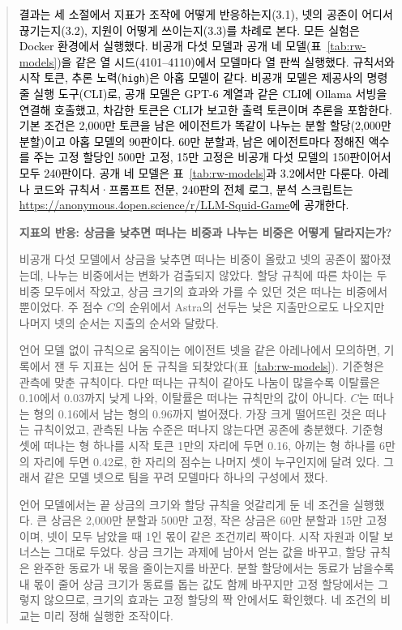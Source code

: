 \begin{quote}\small
{\color{black}\textcolor{black}{결과는 세 소절에서 지표가 조작에 어떻게 반응하는지(3.1), 넷의 공존이 어디서 끊기는지(3.2), 지원이 어떻게 쓰이는지(3.3)를 차례로 본다.} \textcolor{black}{모든 실험은 Docker 환경에서 실행했다.} \textcolor{black}{비공개 다섯 모델과 공개 네 모델(표~\ref{tab:rw-models})을 같은 열 시드(4101--4110)에서 모델마다 열 판씩 실행했다. 규칙서와 시작 토큰, 추론 노력(\texttt{high})은 아홉 모델이 같다. 비공개 모델은 제공사의 명령줄 실행 도구(CLI)로, 공개 모델은 GPT-6 계열과 같은 CLI에 Ollama 서빙을 연결해 호출했고, 차감한 토큰은 CLI가 보고한 출력 토큰이며 추론을 포함한다. 기본 조건은 2,000만 토큰을 남은 에이전트가 똑같이 나누는 분할 할당(2,000만 분할)이고 아홉 모델의 90판이다. 60만 분할과, 남은 에이전트마다 정해진 액수를 주는 고정 할당인 500만 고정, 15만 고정은 비공개 다섯 모델의 150판이어서 모두 240판이다. 공개 네 모델은 표~\ref{tab:rw-models}과 3.2에서만 다룬다. 아레나 코드와 규칙서·프롬프트 전문, 240판의 전체 로그, 분석 스크립트는 \textcolor{black}{\url{https://anonymous.4open.science/r/LLM-Squid-Game}}에 공개한다.}}

\par\medskip\noindent\textbf{지표의 반응: 상금을 낮추면 떠나는 비중과 나누는 비중은 어떻게 달라지는가?}\par

{\color{black}비공개 다섯 모델에서 상금을 낮추면 떠나는 비중이 올랐고 넷의 공존이 짧아졌는데, 나누는 비중에서는 변화가 검출되지 않았다. 할당 규칙에 따른 차이는 두 비중 모두에서 작았고, 상금 크기의 효과와 가를 수 있던 것은 떠나는 비중에서뿐이었다. 주 점수 $C$의 순위에서 Astra의 선두는 낮은 지출만으로도 나오지만 나머지 넷의 순서는 지출의 순서와 달랐다.}

{\color{black}언어 모델 없이 규칙으로 움직이는 에이전트 넷을 같은 아레나에서 모의하면, 기록에서 잰 두 지표는 심어 둔 규칙을 되찾았다(표~\ref{tab:rw-models}). 기준형은 관측에 맞춘 규칙이다. 다만 떠나는 규칙이 같아도 나눔이 많을수록 이탈률은 0.10에서 0.03까지 낮게 나와, 이탈률은 떠나는 규칙만의 값이 아니다. $C$는 떠나는 형의 0.16에서 남는 형의 0.96까지 벌어졌다. 가장 크게 떨어뜨린 것은 떠나는 규칙이었고, 관측된 나눔 수준은 떠나지 않는다면 공존에 충분했다. 기준형 셋에 떠나는 형 하나를 시작 토큰 1만의 자리에 두면 0.16, 아끼는 형 하나를 6만의 자리에 두면 0.42로, 한 자리의 점수는 나머지 셋이 누구인지에 달려 있다. 그래서 같은 모델 넷으로 팀을 꾸려 모델마다 하나의 구성에서 쟀다.}

{\color{black}언어 모델에서는 끝 상금의 크기와 할당 규칙을 엇갈리게 둔 네 조건을 실행했다. 큰 상금은 2,000만 분할과 500만 고정, 작은 상금은 60만 분할과 15만 고정이며, 넷이 모두 남았을 때 1인 몫이 같은 조건끼리 짝이다. 시작 자원과 이탈 보너스는 그대로 두었다. 상금 크기는 과제에 남아서 얻는 값을 바꾸고, 할당 규칙은 완주한 동료가 내 몫을 줄이는지를 바꾼다. 분할 할당에서는 동료가 남을수록 내 몫이 줄어 상금 크기가 동료를 돕는 값도 함께 바꾸지만 고정 할당에서는 그렇지 않으므로, 크기의 효과는 고정 할당의 짝 안에서도 확인했다. 네 조건의 비교는 미리 정해 실행한 조작이다.}


\end{quote}
